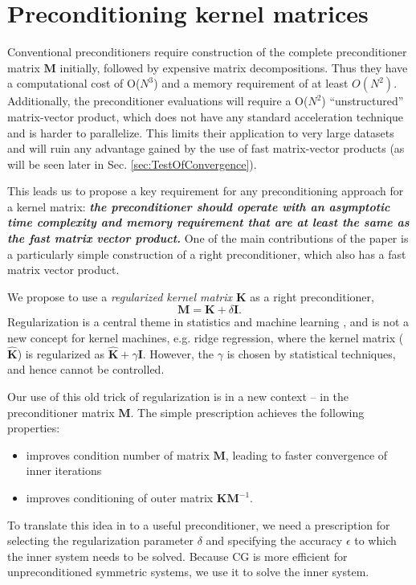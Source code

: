 \documentclass[10pt,journal,letterpaper,compsoc]{IEEEtran}
\begin{document}
\section{Preconditioning kernel matrices \label{sec:ProposedPreconditioner}}
Conventional preconditioners require construction of the complete preconditioner matrix $\mathbf{M}$ initially, followed by expensive matrix decompositions. Thus they have a computational cost of O($N^3$) and a memory requirement of at least $O(N^2)$. Additionally, the preconditioner evaluations will require a O($N^2$) ``unstructured'' matrix-vector product, which does not have any standard acceleration technique and is harder to parallelize. This limits their application to very large datasets and will ruin any advantage gained by the use of fast matrix-vector products (as will be seen later in Sec. \ref{sec:TestOfConvergence}).

This leads us to propose a key requirement for any preconditioning approach for a kernel matrix: \emph{\textbf{the preconditioner should operate with an asymptotic time complexity and memory requirement that are at least the same as the fast matrix vector product.}} One of the main contributions of the paper is a particularly simple construction of a right preconditioner, which also has a fast matrix vector product.

We propose to use a \emph{regularized kernel matrix $\mathbf{K}$} as a right preconditioner,
\begin{equation}\mathbf{M}=\mathbf{K}+\delta \mathbf{I}.\end{equation}
Regularization is a central theme in statistics and machine learning \cite{VapnikStat}, and is not a new concept for kernel machines, e.g. ridge regression, where the kernel matrix ($\mathbf{\hat{K}}$) is regularized as $\mathbf{\hat{K}}+\gamma\mathbf{I}$. However, the $\gamma$ is chosen by statistical techniques, and hence cannot be controlled.

Our use of this old trick of regularization is in a new context -- in the preconditioner matrix $\mathbf{M}$. The simple prescription achieves the following properties:
\begin{itemize}
\item improves condition number of matrix ${\mathbf M}$, leading to faster convergence of inner iterations
\item improves conditioning of outer matrix $\mathbf{KM}^{-1}.$
\end{itemize}
To translate this idea in to a useful preconditioner, we need a prescription for selecting the regularization parameter $\delta$ and specifying the accuracy $\epsilon$ to which the inner system needs to be solved. Because CG is more efficient for unpreconditioned symmetric systems, we use it to solve the inner system.
\end{document}
